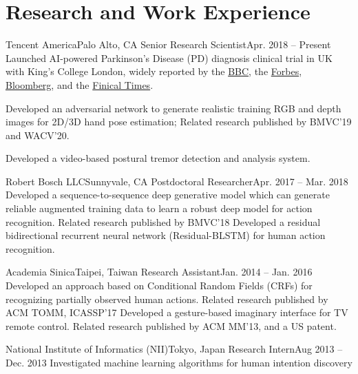 \section{Research and Work Experience}
  \resumeSubHeadingListStart
    \resumeSubheading
      {Tencent America}{Palo Alto, CA}
      {Senior Research Scientist}{Apr. 2018 -- Present}
      \resumeItemListStart
          {Launched AI-powered Parkinson’s Disease (PD) diagnosis clinical trial in UK with King’s College London, widely reported by the \href{https://www.bbc.com/news/technology-50675702}{BBC}, the \href{https://www.forbes.com/sites/samshead/2018/10/08/tencent-aims-to-train-ai-to-spot-parkinsons-in-3-minutes/\#5e47e8ed6f36}{Forbes},
          \href{https://www.bloomberg.com/news/articles/2018-10-08/tencent-reaches-into-london-s-tech-hub-for-parkinson-s-partner}{Bloomberg}, and
          the \href{https://www.ft.com/content/183c412a-6766-11e9-9adc-98bf1d35a056}{Finical Times}.}
          
          {Developed an adversarial network to generate realistic training RGB and depth images for 2D/3D hand pose estimation; Related research published by BMVC'19 and WACV'20.}
        
        {Developed a video-based postural tremor detection and analysis system.}
      \resumeItemListEnd

      \resumeSubheading
      {Robert Bosch LLC}{Sunnyvale, CA}
      {Postdoctoral Researcher}{Apr. 2017 -- Mar. 2018}
      \resumeItemListStart
          {Developed a sequence-to-sequence deep generative model which can generate reliable augmented training data to learn a robust deep model for action recognition. Related research published by BMVC'18}
          {Developed a residual bidirectional recurrent neural network (Residual-BLSTM) for human action recognition.}
      \resumeItemListEnd
    
    \resumeSubheading
      {Academia Sinica}{Taipei, Taiwan}
      {Research Assistant}{Jan. 2014 – Jan. 2016}
      \resumeItemListStart
          {Developed an approach based on Conditional Random Fields (CRFs) for recognizing partially observed human actions. Related research published by ACM TOMM, ICASSP'17}
          {Developed a gesture-based imaginary interface for TV remote control. Related research published by ACM MM'13, and a US patent.}
      \resumeItemListEnd
      
      \resumeSubheading
      {National Institute of Informatics (NII)}{Tokyo, Japan}
      {Research Intern}{Aug 2013 – Dec. 2013}
      \resumeItemListStart
          {Investigated machine learning algorithms for human intention discovery}
      \resumeItemListEnd

  \resumeSubHeadingListEnd